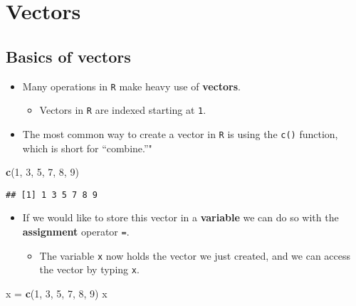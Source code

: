 \documentclass[]{book}
\newenvironment{Shaded}{\begin{snugshade}}{\end{snugshade}}
\newcommand{\DecValTok}[1]{\textcolor[rgb]{0.00,0.00,0.81}{#1}}
\newcommand{\KeywordTok}[1]{\textcolor[rgb]{0.13,0.29,0.53}{\textbf{#1}}}
\newcommand{\NormalTok}[1]{#1}
\newcommand{\StringTok}[1]{\textcolor[rgb]{0.31,0.60,0.02}{#1}}
\providecommand{\tightlist}{%
  \setlength{\itemsep}{0pt}\setlength{\parskip}{0pt}}
\begin{document}
\hypertarget{vectors}{%
\section{Vectors}\label{vectors}}

\hypertarget{basics-of-vectors}{%
\subsection{Basics of vectors}\label{basics-of-vectors}}

\begin{itemize}
\tightlist
\item
  Many operations in \texttt{R} make heavy use of \textbf{vectors}.

  \begin{itemize}
  \tightlist
  \item
    Vectors in \texttt{R} are indexed starting at \texttt{1}.
  \end{itemize}
\item
  The most common way to create a vector in \texttt{R} is using the \texttt{c()} function, which is short for ``combine.''"
\end{itemize}

\begin{Shaded}
\begin{Highlighting}[]
\KeywordTok{c}\NormalTok{(}\DecValTok{1}\NormalTok{, }\DecValTok{3}\NormalTok{, }\DecValTok{5}\NormalTok{, }\DecValTok{7}\NormalTok{, }\DecValTok{8}\NormalTok{, }\DecValTok{9}\NormalTok{)}
\end{Highlighting}
\end{Shaded}

\begin{verbatim}
## [1] 1 3 5 7 8 9
\end{verbatim}

\begin{itemize}
\tightlist
\item
  If we would like to store this vector in a \textbf{variable} we can do so with the \textbf{assignment} operator \texttt{=}.

  \begin{itemize}
  \tightlist
  \item
    The variable \texttt{x} now holds the vector we just created, and we can access the vector by typing \texttt{x}.
  \end{itemize}
\end{itemize}

\begin{Shaded}
\begin{Highlighting}[]
\NormalTok{x =}\StringTok{ }\KeywordTok{c}\NormalTok{(}\DecValTok{1}\NormalTok{, }\DecValTok{3}\NormalTok{, }\DecValTok{5}\NormalTok{, }\DecValTok{7}\NormalTok{, }\DecValTok{8}\NormalTok{, }\DecValTok{9}\NormalTok{)}
\NormalTok{x}
\end{Highlighting}
\end{Shaded}
\end{document}
